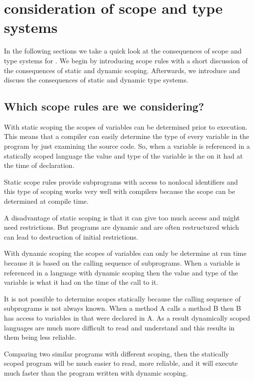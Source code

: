 \section{consideration of scope and type systems}

In the following sections we take a quick look at the consequences of scope and
type systems for \productname{}. We begin by introducing scope rules with a
short discussion of the consequences of static and dynamic scoping. Afterwards,
we introduce and discuss the consequences of static and dynamic type systems.

\subsection{Which scope rules are we considering?}

With static scoping the scopes of variables can be determined prior to
execution. This means that a compiler can easily determine the type of every
variable in the program by just examining the source code. So, when a variable
is referenced in a statically scoped language the value and type of the variable 
is the on it had at the time of declaration.
\cite[p. xxx]{sebesta2013}

Static scope rules provide subprograms with access to nonlocal identifiers and
this type of scoping works very well with compilers because the scope can be
determined at compile time.
\cite[p. xxx]{sebesta2013}

A disadvantage of static scoping is that it can give too much access and might
need restrictions. But programs are dynamic and are often restructured which
can lead to destruction of initial restrictions.
\cite[p. xxx]{sebesta2013}

With dynamic scoping the scopes of variables can only be determine at run time
because it is based on the calling sequence of subprograms. When a variable is
referenced in a language with dynamic scoping then the value and type of the 
variable is what it had on the time of the call to it.
\cite[p. xxx]{sebesta2013}

It is not possible to determine scopes statically because the calling sequence
of subprograms is not always known. When a method A calls a method B then B has 
access to variables in that were declared in A. As a result dynamically scoped
languages are much more difficult to read and understand and this results in
them being less reliable.
\cite[p. xxx]{sebesta2013}

Comparing two similar programs with different scoping, then the statically
scoped program will be much easier to read, more reliable, and it will execute
much faster than the program written with dynamic scoping.
\cite[p. xxx]{sebesta2013}


